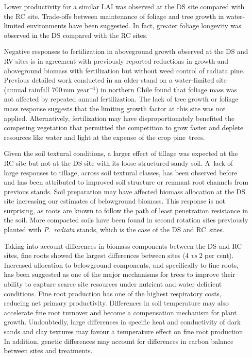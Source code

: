 \documentclass[final]{foresj}
\begin{document}
Lower productivity for a similar LAI was observed at the DS
site compared with the RC site. Trade-offs between
maintenance of foliage and tree growth in water-limited
environments have been suggested.\cite{65} In fact, greater
foliage longevity was observed in the DS compared with the
RC sites.\cite{66}

Negative responses to fertilization in aboveground growth
observed at the DS and RV sites is in agreement with
previously reported reductions in growth and aboveground
biomass with fertilization but without weed control of
radiata pine.\cite{49,50,67} Previous detailed work
conducted in an older stand on a water-limited site (annual
rainfall 700\,mm year$^{-1})$ in northern Chile found that
foliage mass was not affected by repeated annual
fertilization.\cite{68} The lack of tree growth or foliage
mass response suggests that the limiting growth factor at
this site was not applied.\cite{21,32} Alternatively,
fertilization may have disproportionately benefited the
competing vegetation that permitted the competition to grow
faster and deplete resources like water and light at the
expense of the crop pine~trees.

Given the soil textural conditions, a larger effect of
tillage was expected at the RC site but not at the DS site
with its loose structured sandy soil. A~lack of large
responses to tillage, across soil textural classes, has
been observed before and has been attributed to improved
soil structure or remnant root channels from previous
stands.\cite{69} Soil preparation may have affected biomass
allocation at the DS site increasing our estimates of
belowground biomass. This response is not surprising, as
roots are known to follow the path of least penetration
resistance in the soil. More compacted soils have been
found in second rotation sites previously planted with
\textit{P.~radiata} stands,\cite{36,38} which is the case
of the DS and RC~sites.

Taking into account differences in biomass components
between the DS and RC sites, fine roots showed the largest
differences between sites (4 \textit{vs} 2 per cent).
Increased allocation to belowground components, and
specifically to fine roots, has been suggested as one of
the major mechanisms for trees to improve their ability to
capture scarce site resources under nutrient and water
deficient conditions.\cite{4,11,70} Fine root production
has one of the highest respiratory costs, reducing net
primary productivity.\cite{71,72,73} Differences in soil
temperature may also accelerate fine root turnover and
become a compensation mechanism for plant growth.\cite{72}
Undoubtedly, large differences in specific heat and
conductivity of dark sands and clay textures may favour a
temperature effect on fine root production. In addition,
genetic differences may account for differences in carbon
balance between sites and treatments.\cite{74,75}
\end{document}
